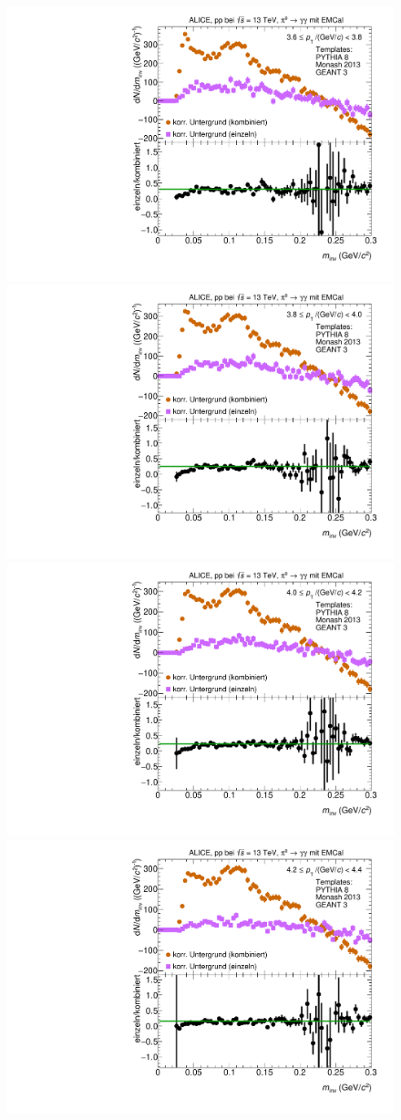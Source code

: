 \begin{figure}[t]
\centering
\begin{multicols}{2}
    \includegraphics[width=.65\linewidth]{Anhang/BackgroundWithRatio12_Data_2016.pdf}\par 
    \includegraphics[width=.65\linewidth]{Anhang/BackgroundWithRatio13_Data_2016.pdf}\par 
\end{multicols}
\begin{multicols}{2}
    \includegraphics[width=.65\linewidth]{Anhang/BackgroundWithRatio14_Data_2016.pdf}\par
    \includegraphics[width=.65\linewidth]{Anhang/BackgroundWithRatio15_Data_2016.pdf}\par

\end{multicols}
\end{figure}

